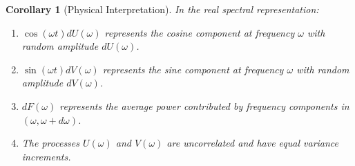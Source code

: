 \documentclass{article}
\newtheorem{corollary}{Corollary}
\begin{document}
\begin{corollary}
  [Physical Interpretation] In the real spectral representation:
  \begin{enumerate}
    \item $\cos (\omega t) dU (\omega)$ represents the cosine component at
    frequency $\omega$ with random amplitude $dU (\omega)$.
    
    \item $\sin (\omega t) dV (\omega)$ represents the sine component at
    frequency $\omega$ with random amplitude $dV (\omega)$.
    
    \item $dF (\omega)$ represents the average power contributed by frequency
    components in $(\omega, \omega + d \omega)$.
    
    \item The processes $U (\omega)$ and $V (\omega)$ are uncorrelated and
    have equal variance increments.
  \end{enumerate}
\end{corollary}
\end{document}
